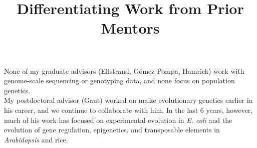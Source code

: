 \documentclass[11pt,letterpaper]{article}
\title{Differentiating Work from Prior Mentors}
\date{}
\begin{document}
\maketitle
\noindent None of my graduate advisors (Ellstrand, G\'{o}mez-Pompa, Hamrick) work with genome-scale sequencing or genotyping data, and none focus on population genetics.\\

\noindent My postdoctoral advisor (Gaut) worked on maize evolutionary genetics earlier in his career, and we continue to collaborate with him.
In the last 6 years, however, much of his work has focused on experimental evolution in \emph{E. coli} and the evolution of gene regulation, epigenetics, and transposable elements in \emph{Arabidopsis} and rice. 
\end{document}
